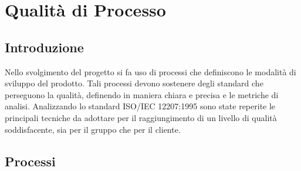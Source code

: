 \section{Qualità di Processo}

\subsection{Introduzione}

Nello svolgimento del progetto si fa uso di processi che definiscono le modalità di sviluppo del prodotto. Tali processi devono sostenere degli standard che perseguono la qualità, definendo in maniera chiara e precisa e le metriche di analisi. Analizzando lo standard ISO/IEC 12207:1995 sono state reperite le principali tecniche da adottare per il raggiungimento di un livello di qualità soddisfacente, sia per il gruppo che per il cliente.



\subsection{Processi }



